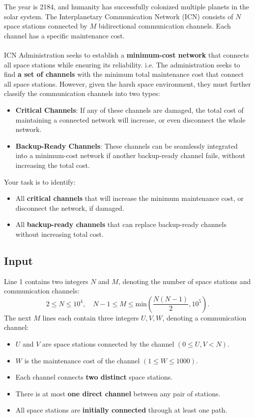 \documentclass[12pt,a4paper]{article}
\begin{document}
\noindent
The year is 2184, and humanity has successfully colonized multiple planets in the solar system. The Interplanetary Communication Network (ICN) consists of \( N \) space stations connected by \( M \) bidirectional communication channels. Each channel has a specific maintenance cost.
\\\\
\noindent
ICN Administration seeks to establish a \textbf{minimum-cost network} that connects all space stations while ensuring its reliability. i.e. The administration seeks to find \textbf{a set of channels} with the minimum total maintenance cost that connect all space stations. However, given the harsh space environment, they must further classify the communication channels into two types:

\begin{itemize}
    \item \textbf{Critical Channels}: If any of these channels are damaged, the total cost of maintaining a connected network will increase, or even disconnect the whole network.
    \item \textbf{Backup-Ready Channels}: These channels can be seamlessly integrated into a minimum-cost network if another backup-ready channel fails, without increasing the total cost.
\end{itemize}

\noindent
Your task is to identify:
\begin{itemize}
    \item All \textbf{critical channels} that will increase the minimum maintenance cost, or disconnect the network, if damaged.
    \item All \textbf{backup-ready channels} that can replace backup-ready channels without increasing total cost.
\end{itemize}

\subsection*{\fontsize{16}{12}Input}
Line 1 contains two integers \( N \) and \( M \), denoting the number of space stations and communication channels:
    \[
    2 \leq N \leq 10^4, \quad N-1 \leq M \leq \text{min}(\frac{N(N-1)}{2},10^5).
    \]
\noindent
The next \( M \) lines each contain three integers \( U, V, W \), denoting a communication channel:
    \begin{itemize}
        \item \( U \) and \( V \) are space stations connected by the channel \((0 \leq U, V < N)\).
        \item \( W \) is the maintenance cost of the channel \((1 \leq W \leq 1000)\).
        \item Each channel connects \textbf{two distinct} space stations.
        \item There is at most \textbf{one direct channel} between any pair of stations.
        \item All space stations are \textbf{initially connected} through at least one path.
    \end{itemize}
\end{document}
